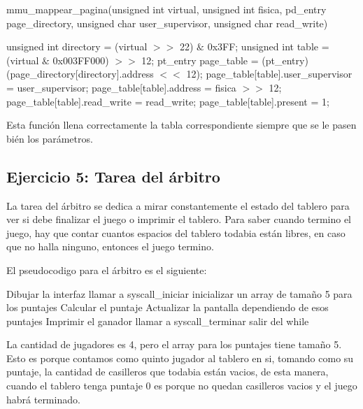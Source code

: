 \documentclass[a4paper,10pt,twoside]{article}
\newenvironment{pseudocodigo}
    {\vspace{0.5em} \begin{algorithmic}}
    {\end{algorithmic} \vspace{0.5em}}
\begin{document}
mmu\_mappear\_pagina(unsigned int virtual, unsigned int fisica, pd\_entry\* page\_directory, unsigned char user\_supervisor, unsigned char read\_write)
\begin{pseudocodigo}
  \STATE unsigned int directory = (virtual $>>$ 22) $\&$ 0x3FF;
  \STATE unsigned int table = (virtual $\&$ 0x003FF000) $>>$ 12;
  \STATE 
  \STATE pt\_entry\* page\_table = (pt\_entry\*) (page\_directory[directory].address $<<$ 12);
  \STATE 
  \STATE page\_table[table].user\_supervisor = user\_supervisor;
  \STATE page\_table[table].address = fisica $>>$ 12;
  \STATE page\_table[table].read\_write = read\_write;
  \STATE page\_table[table].present = 1;
\end{pseudocodigo}

Esta función llena correctamente la tabla correspondiente siempre que se le pasen bién los parámetros.\\

\subsection{Ejercicio 5: Tarea del árbitro}

La tarea del árbitro se dedica a mirar constantemente el estado del tablero para ver si debe finalizar el juego o imprimir el tablero.
Para saber cuando termino el juego, hay que contar cuantos espacios del tablero todabia están libres, en caso que no halla ninguno, entonces el juego termino.

El pseudocodigo para el árbitro es el siguiente:\\

\begin{pseudocodigo}
  \STATE Dibujar la interfaz
  \STATE llamar a syscall\_iniciar
  \STATE inicializar un array de tamaño 5 para los puntajes
  \STATE
    \STATE
    \STATE Calcular el puntaje
    \STATE Actualizar la pantalla dependiendo de esos puntajes
    \STATE
      \STATE
      \STATE Imprimir el ganador
      \STATE llamar a syscall\_terminar
      \STATE salir del while
    \ENDIF
  \ENDWHILE
  \STATE
\end{pseudocodigo}

La cantidad de jugadores es 4, pero el array para los puntajes tiene tamaño 5. Esto es porque contamos como quinto  jugador al tablero en si, tomando como su puntaje, la cantidad de casilleros que todabia están vacios, de esta manera, cuando el tablero tenga puntaje $0$ es porque no quedan casilleros vacios y el juego habrá terminado.
\end{document}
